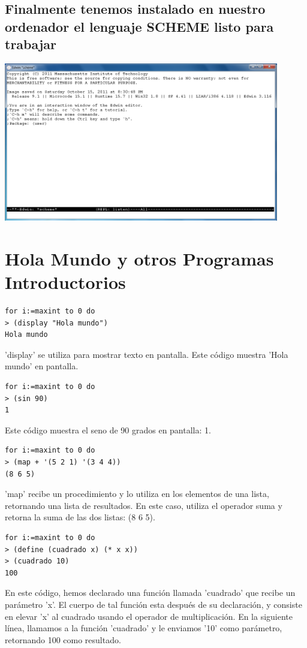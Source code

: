 \documentclass[11pt]{article} %
\begin{document}
\subsection{Finalmente tenemos instalado en nuestro ordenador el lenguaje SCHEME listo para trabajar}
\begin{center}
\includegraphics[width=12cm]{8.png}
\end{center}

\section{Hola Mundo y otros Programas Introductorios}

\begin{lstlisting}[frame=single]  % Start your code-block
for i:=maxint to 0 do
> (display "Hola mundo")
Hola mundo
\end{lstlisting}
'display' se utiliza para mostrar texto en pantalla. Este código muestra 'Hola mundo' en pantalla.

\begin{lstlisting}[frame=single]  % Start your code-block
for i:=maxint to 0 do
> (sin 90)
1
\end{lstlisting}
Este código muestra el seno de 90 grados en pantalla: 1.

\begin{lstlisting}[frame=single]  % Start your code-block
for i:=maxint to 0 do
> (map + '(5 2 1) '(3 4 4))
(8 6 5)
\end{lstlisting}
'map' recibe un procedimiento y lo utiliza en los elementos de una lista, retornando una lista de resultados.
En este caso, utiliza el operador suma y retorna la suma de las dos listas: (8 6 5).

\begin{lstlisting}[frame=single]  % Start your code-block
for i:=maxint to 0 do
> (define (cuadrado x) (* x x))
> (cuadrado 10)
100
\end{lstlisting}
En este código, hemos declarado una función llamada 'cuadrado' que recibe un parámetro 'x'. El cuerpo de tal función esta después de su declaración, y consiste en elevar 'x' al cuadrado usando el operador de multiplicación. En la siguiente línea, llamamos a la función 'cuadrado' y le enviamos '10' como parámetro, retornando 100 como resultado.
\end{document}
